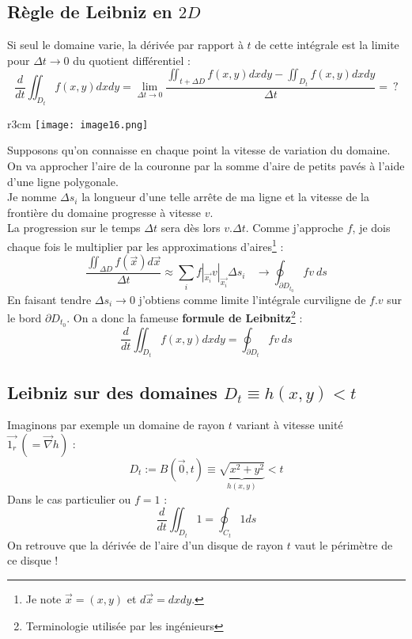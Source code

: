 \documentclass[11pt, a4paper, openany]{book}
\begin{document}
									
		\subsection{Règle de Leibniz en $2D$}
		Si seul le domaine varie, la dérivée par rapport à $t$ de cette intégrale est la limite pour $\Delta t \rightarrow 0$ du quotient différentiel :
		\begin{equation}
			\frac{d}{dt} \iint_{D_t} f(x,y) dxdy = \lim\limits_{\Delta t \rightarrow 0} \dfrac{\iint_{t + \Delta D} f(x,y) dxdy - \iint_{D_t} f(x,y)dxdy}{\Delta t} =\  ?
		\end{equation}
		\begin{wrapfigure}[10]{r}{3cm}
			\texttt{[image: image16.png]}
		\end{wrapfigure}
		Supposons qu'on connaisse en chaque point la vitesse de variation du domaine. On va approcher l'aire de la couronne par la somme d'aire de petits pavés à l'aide d'une ligne polygonale. \\
									
		Je nomme $\Delta s_i$ la longueur d'une telle arrête de ma ligne et la vitesse de la frontière du domaine progresse à vitesse $v$.\\
		La progression sur le temps $\Delta t$ sera dès lors $v.\Delta t$. Comme j'approche $f$, je dois chaque fois le multiplier par les approximations d'aires\footnote{Je note $\vec{x} = (x,y)$ et $d\vec{x} = dxdy$.} :
		\begin{equation}
			\dfrac{\iint_{\Delta D} f(\vec{x})d\vec{x}}{\Delta t} \approx \sum_i f|_{\vec{x_i}}v|_{\vec{x_i}}\Delta s_i \ \ \ \ \rightarrow \oint_{\partial D_{t_0}}fv\ ds
		\end{equation}
		En faisant tendre $\Delta s_i \rightarrow 0$ j'obtiens comme limite l'intégrale curviligne de $f.v$ sur le bord $\partial D_{t_0}$.
		On a donc la fameuse \textbf{formule de Leibnitz}\footnote{Terminologie utilisée par les ingénieurs} :
		\begin{equation}
			\frac{d}{dt}\iint_{D_t} f(x,y) dx dy = \oint_{\partial D_t}fv\ ds
		\end{equation}
									
		\subsection{Leibniz sur des domaines $D_t \equiv h(x,y) <t$}
		Imaginons par exemple un domaine de rayon $t$ variant à vitesse unité $\vec{1_r}\ (= \vec{\nabla}h)$ :
		\begin{equation}
			D_t := B(\vec{0},t) \equiv \underbrace{\sqrt{x^2 + y^2}}_{h(x,y)} < t
		\end{equation}
		Dans le cas particulier ou $f=1$ :
		\begin{equation}
			\frac{d}{dt}\iint_{D_t} 1 = \oint_{C_t} 1 ds
		\end{equation}
		On retrouve que la dérivée de l'aire d'un disque de rayon $t$ vaut le périmètre de ce disque !\\
									
\end{document}
